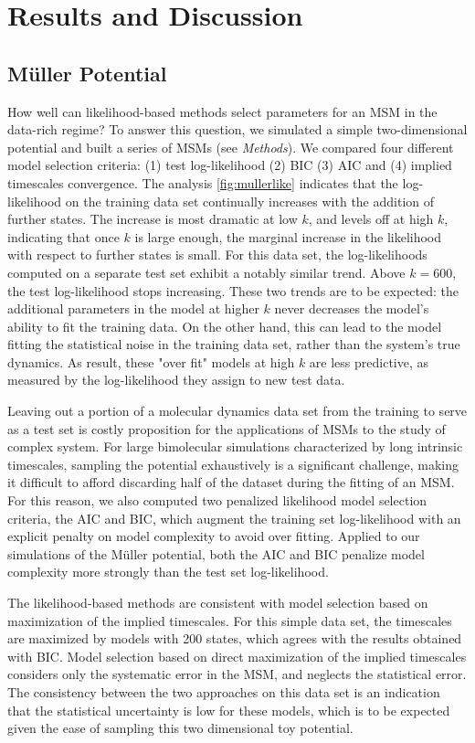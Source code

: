\documentclass[journal=jpcbfk, layout=traditional, manuscript=article]{achemso}
\begin{document}
\section{Results and Discussion}
\subsection{M\"{u}ller Potential}

How well can likelihood-based methods select parameters for an MSM in the data-rich regime? To answer this question, we simulated a simple two-dimensional potential and built a series of MSMs (see \emph{Methods}). We compared four different model selection criteria: (1) test log-likelihood (2) BIC (3) AIC and (4) implied timescales convergence. The analysis \cref{fig:mullerlike} indicates that the log-likelihood on the training data set continually increases with the addition of further states. The increase is most dramatic at low $k$, and levels off at high $k$, indicating that once $k$ is large enough, the marginal increase in the likelihood with respect to further states is small. For this data set, the log-likelihoods computed on a separate test set exhibit a notably similar trend. Above $k=600$, the test log-likelihood stops increasing. These two trends are to be expected: the additional parameters in the model at higher $k$ never decreases the model's ability to fit the training data. On the other hand, this can lead to the model fitting the statistical noise in the training data set, rather than the system's true dynamics. As result, these "over fit" models at high $k$ are less predictive, as measured by the log-likelihood they assign to new test data.

Leaving out a portion of a molecular dynamics data set from the training to serve as a test set is costly proposition for the applications of MSMs to the study of complex system. For large bimolecular simulations characterized by long intrinsic timescales, sampling the potential exhaustively is a significant challenge\cite{Lane2013Milliseconds}, making it difficult to afford discarding half of the dataset during the fitting of an MSM. For this reason, we also computed two penalized likelihood model selection criteria, the AIC and BIC, which augment the training set log-likelihood with an explicit penalty on model complexity to avoid over fitting. Applied to our simulations of the M\"{u}ller potential, both the AIC and BIC penalize model complexity more strongly than the test set log-likelihood.

The likelihood-based methods are consistent with model selection based on maximization of the implied timescales. For this simple data set, the timescales are maximized by models with 200 states, which agrees with the results obtained with BIC. Model selection based on direct maximization of the implied timescales considers only the systematic error in the MSM, and neglects the statistical error. The consistency between the two approaches on this data set is an indication that the statistical uncertainty is low for these models, which is to be expected given the ease of sampling this two dimensional toy potential.
\end{document}
